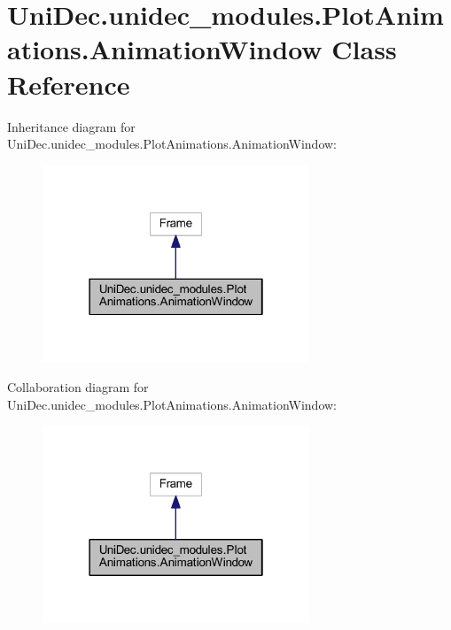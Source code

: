 \hypertarget{class_uni_dec_1_1unidec__modules_1_1_plot_animations_1_1_animation_window}{}\section{Uni\+Dec.\+unidec\+\_\+modules.\+Plot\+Animations.\+Animation\+Window Class Reference}
\label{class_uni_dec_1_1unidec__modules_1_1_plot_animations_1_1_animation_window}


Inheritance diagram for Uni\+Dec.\+unidec\+\_\+modules.\+Plot\+Animations.\+Animation\+Window\+:\nopagebreak
\begin{figure}[H]
\begin{center}
\leavevmode
\includegraphics[width=226pt]{class_uni_dec_1_1unidec__modules_1_1_plot_animations_1_1_animation_window__inherit__graph}
\end{center}
\end{figure}


Collaboration diagram for Uni\+Dec.\+unidec\+\_\+modules.\+Plot\+Animations.\+Animation\+Window\+:\nopagebreak
\begin{figure}[H]
\begin{center}
\leavevmode
\includegraphics[width=226pt]{class_uni_dec_1_1unidec__modules_1_1_plot_animations_1_1_animation_window__coll__graph}
\end{center}
\end{figure}
